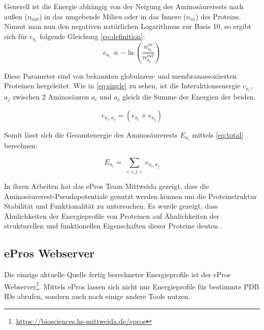 Generell ist die Energie abhängig von der Neigung des Aminosäurerests nach außen ($n_{out}$) in das umgebende Milieu oder in das Innere ($n_{in}$) des Proteins. Nimmt man nun den negativen natürlichen Logarithmus zur Basis 10, so ergibt sich für $e_{a_i}$ folgende Gleichung \ref{eq:definition}:
%
\begin{equation}
  	e_{a_i} \propto -\ln{\left(\frac{n_{a_i}^{in}}{n_{a_i}^{out}}\right)}
  	\label{eq:definition}
\end{equation}

Diese Parameter sind von bekannten globularen- und membranassoziierten Proteinen hergeleitet. Wie in \ref{eq:single} zu sehen, ist die Interaktionsenergie $e_{a_{i}}$, $a_{j}$ zwischen 2 Aminosäuren $a_{i}$ und $a_{j}$ gleich die Summe der Energien der beiden. 

\begin{equation}
  	e_{a_{i},a_{j}} = \left( e_{a_{i}} + e_{a_{j}} \right)
    \label{eq:single}
\end{equation}

Somit lässt sich die Gesamtenergie des Aminosäurerests $E_{a_i}$ mittels \ref{eq:total} berechnen:

\begin{equation}
    E_{a_{i}} = \sum_{< i, j >}{e_{a_{i},a_{j}}}
    \label{eq:total}
\end{equation}

In ihren Arbeiten hat das ePros Team Mittweida gezeigt, dass die Aminosäurerest-Pseudopotentiale genutzt werden können um die Proteinstruktur Stabilität und Funktionalität zu untersuchen. Es wurde gezeigt, dass Ähnlichkeiten der Energieprofile von Proteinen auf Ähnlichkeiten der strukturellen und funktionellen Eigenschaften dieser Proteine deuten \cite{Heinke.2011}.


\subsection{ePros Webserver}
\label{sec:epros}
Die einzige aktuelle Quelle fertig berechneter Energieprofile ist der ePros Webserver\footnote{\url{https://biosciences.hs-mittweida.de/epros}}. Mittels ePros lassen sich nicht nur Energieprofile für bestimmte \ac{PDB} IDs abrufen, sondern auch noch einige andere Tools nutzen.

